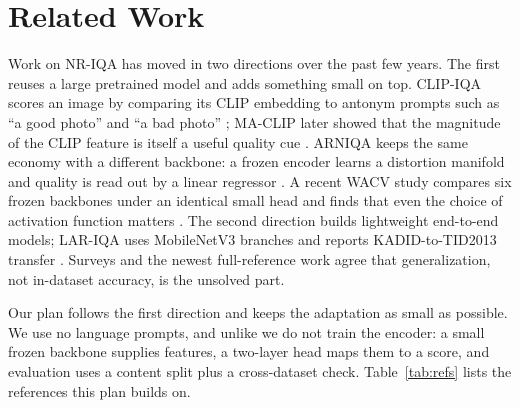 \documentclass[11pt]{article}
\begin{document}
\section{Related Work}
\label{sec:related}
Work on NR-IQA has moved in two directions over the past few years. The first reuses a
large pretrained model and adds something small on top. CLIP-IQA scores an image by
comparing its CLIP embedding to antonym prompts such as ``a good photo'' and ``a bad
photo'' \citep{wang2023clipiqa}; MA-CLIP later showed that the magnitude of the CLIP
feature is itself a useful quality cue \citep{liao2026maclip}. ARNIQA keeps the same
economy with a different backbone: a frozen encoder learns a distortion manifold and
quality is read out by a linear regressor \citep{agnolucci2024arniqa}. A recent WACV study
compares six frozen backbones under an identical small head and finds that even the choice
of activation function matters \citep{yadav2026vlfoundations}. The second direction builds
lightweight end-to-end models; LAR-IQA uses MobileNetV3 branches and reports
KADID-to-TID2013 transfer \citep{jamshidi2024lariqa}. Surveys \citep{ma2025survey} and the
newest full-reference work \citep{chen2025afine} agree that generalization, not in-dataset
accuracy, is the unsolved part.

Our plan follows the first direction and keeps the adaptation as small as possible. We use
no language prompts, and unlike \citet{jamshidi2024lariqa} we do not train the encoder: a
small frozen backbone supplies features, a two-layer head maps them to a score, and
evaluation uses a content split plus a cross-dataset check. Table~\ref{tab:refs} lists the
references this plan builds on.
\end{document}
